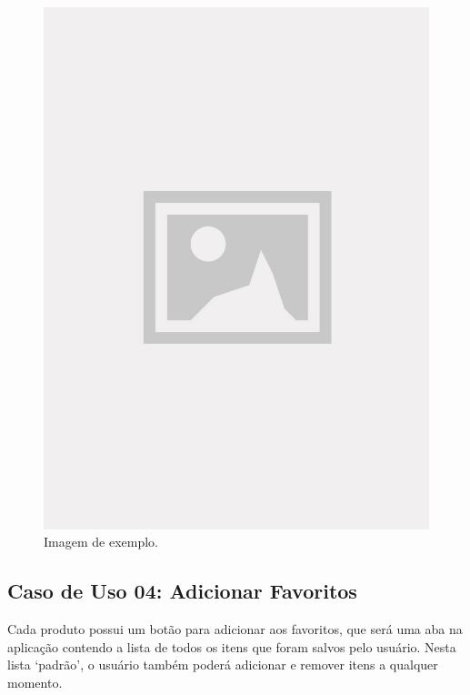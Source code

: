 \begin{figure}[!htb]
\centering
\caption{Imagem de exemplo.}
\includegraphics[width=\linewidth]{figuras/placeholder.jpg}
\end{figure}

\subsection{Caso de Uso 04: Adicionar Favoritos}

Cada produto possui um botão para adicionar aos favoritos, que será uma aba na aplicação contendo a lista de todos os itens que foram salvos pelo usuário. Nesta lista ‘padrão’, o usuário também poderá adicionar e remover itens a qualquer momento.

